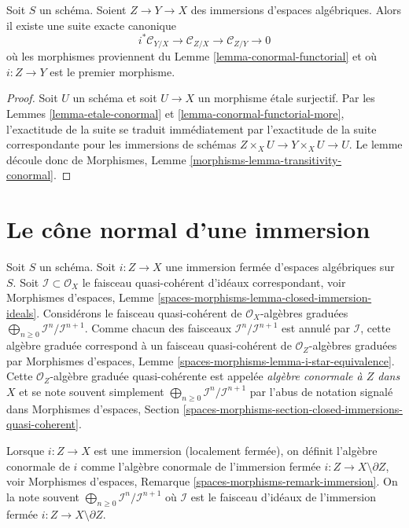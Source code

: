 \begin{lemma}
\label{lemma-transitivity-conormal}
Soit $S$ un schéma.
Soient $Z \to Y \to X$ des immersions d'espaces algébriques.
Alors il existe une suite exacte canonique
$$
i^*\mathcal{C}_{Y/X} \to
\mathcal{C}_{Z/X} \to
\mathcal{C}_{Z/Y} \to 0
$$
où les morphismes proviennent du
Lemme \ref{lemma-conormal-functorial}
et où $i : Z \to Y$ est le premier morphisme.
\end{lemma}

\begin{proof}
Soit $U$ un schéma et soit $U \to X$ un morphisme étale surjectif. Par les
Lemmes \ref{lemma-etale-conormal} et \ref{lemma-conormal-functorial-more},
l'exactitude de la suite se traduit immédiatement par
l'exactitude de la suite correspondante pour les immersions de schémas
$Z \times_X U \to Y \times_X U \to U$. Le lemme découle donc de
Morphismes, Lemme \ref{morphisms-lemma-transitivity-conormal}.
\end{proof}








\section{Le cône normal d'une immersion}
\label{section-normal-cone}

\noindent
Soit $S$ un schéma. Soit $i : Z \to X$ une immersion fermée d'espaces
algébriques sur $S$. Soit $\mathcal{I} \subset \mathcal{O}_X$ le
faisceau quasi-cohérent d'idéaux correspondant, voir
Morphismes d'espaces, Lemme
\ref{spaces-morphisms-lemma-closed-immersion-ideals}.
Considérons le faisceau quasi-cohérent de $\mathcal{O}_X$-algèbres graduées
$\bigoplus_{n \geq 0} \mathcal{I}^n/\mathcal{I}^{n + 1}$.
Comme chacun des faisceaux $\mathcal{I}^n/\mathcal{I}^{n + 1}$
est annulé par $\mathcal{I}$, cette algèbre graduée
correspond à un faisceau quasi-cohérent de $\mathcal{O}_Z$-algèbres graduées par
Morphismes d'espaces, Lemme \ref{spaces-morphisms-lemma-i-star-equivalence}.
Cette $\mathcal{O}_Z$-algèbre graduée quasi-cohérente est appelée
{\it algèbre conormale à $Z$ dans $X$} et se note souvent simplement
$\bigoplus_{n \geq 0} \mathcal{I}^n/\mathcal{I}^{n + 1}$
par l'abus de notation signalé dans
Morphismes d'espaces, Section
\ref{spaces-morphisms-section-closed-immersions-quasi-coherent}.

\medskip\noindent
Lorsque $i : Z \to X$ est une immersion (localement fermée), on définit l'algèbre
conormale de $i$ comme l'algèbre conormale de l'immersion fermée
$i : Z \to X \setminus \partial Z$, voir Morphismes d'espaces, Remarque
\ref{spaces-morphisms-remark-immersion}.
On la note souvent
$\bigoplus_{n \geq 0} \mathcal{I}^n/\mathcal{I}^{n + 1}$
où $\mathcal{I}$ est le faisceau d'idéaux
de l'immersion fermée $i : Z \to X \setminus \partial Z$.

